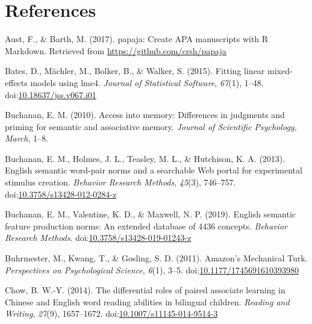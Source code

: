 \documentclass[english,,man]{apa6}
\begin{document}
\newpage

\hypertarget{references}{%
\section{References}\label{references}}

\setlength{\parindent}{-0.5in}
\setlength{\leftskip}{0.5in}

\hypertarget{refs}{}
\leavevmode\hypertarget{ref-Aust2017}{}%
Aust, F., \& Barth, M. (2017). papaja: Create APA manuscripts with R Markdown. Retrieved from \url{https://github.com/crsh/papaja}

\leavevmode\hypertarget{ref-Bates2015}{}%
Bates, D., Mächler, M., Bolker, B., \& Walker, S. (2015). Fitting linear mixed-effects models using lme4. \emph{Journal of Statistical Software}, \emph{67}(1), 1--48. doi:\href{https://doi.org/10.18637/jss.v067.i01}{10.18637/jss.v067.i01}

\leavevmode\hypertarget{ref-Buchanan2010}{}%
Buchanan, E. M. (2010). Access into memory: Differences in judgments and priming for semantic and associative memory. \emph{Journal of Scientific Psychology}, \emph{March}, 1--8.

\leavevmode\hypertarget{ref-Buchanan2013}{}%
Buchanan, E. M., Holmes, J. L., Teasley, M. L., \& Hutchison, K. A. (2013). English semantic word-pair norms and a searchable Web portal for experimental stimulus creation. \emph{Behavior Research Methods}, \emph{45}(3), 746--757. doi:\href{https://doi.org/10.3758/s13428-012-0284-z}{10.3758/s13428-012-0284-z}

\leavevmode\hypertarget{ref-Buchanan2019}{}%
Buchanan, E. M., Valentine, K. D., \& Maxwell, N. P. (2019). English semantic feature production norms: An extended database of 4436 concepts. \emph{Behavior Research Methods}. doi:\href{https://doi.org/10.3758/s13428-019-01243-z}{10.3758/s13428-019-01243-z}

\leavevmode\hypertarget{ref-Buhrmester2011}{}%
Buhrmester, M., Kwang, T., \& Gosling, S. D. (2011). Amazon's Mechanical Turk. \emph{Perspectives on Psychological Science}, \emph{6}(1), 3--5. doi:\href{https://doi.org/10.1177/1745691610393980}{10.1177/1745691610393980}

\leavevmode\hypertarget{ref-Chow2014}{}%
Chow, B. W.-Y. (2014). The differential roles of paired associate learning in Chinese and English word reading abilities in bilingual children. \emph{Reading and Writing}, \emph{27}(9), 1657--1672. doi:\href{https://doi.org/10.1007/s11145-014-9514-3}{10.1007/s11145-014-9514-3}
\end{document}
